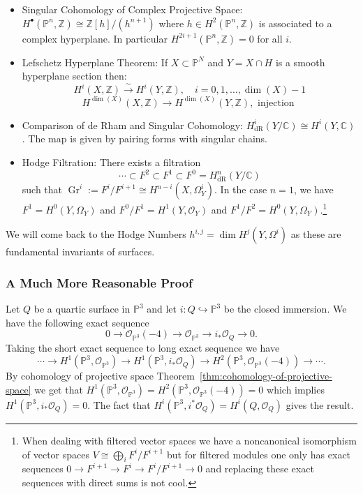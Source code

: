 \documentclass[12pt]{article}
\numberwithin{equation}{section}
\theoremstyle{definition}
\theoremstyle{remark}
\newcommand{\CC}{\mathbb{C}}
\newcommand{\ZZ}{\mathbb{Z}}
\newcommand{\Ocal}{\mathcal{O}}
\newcommand{\PP}{\mathbb{P}}
\newcommand{\dR}{\operatorname{dR}}
\newcommand{\Gr}{\operatorname{Gr}}
\begin{document}
\begin{itemize}
	\item Singular Cohomology of Complex Projective Space: $H^{\bullet}(\PP^n,\ZZ) \cong \ZZ[h]/(h^{n+1})$ where $h\in H^2(\PP^n,\ZZ)$ is associated to a complex hyperplane. 
	In particular $H^{2i+1}(\PP^n,\ZZ)=0$ for all $i$. 
	\item Lefschetz Hyperplane Theorem: If $X \subset \PP^N$ and $Y = X \cap H$ is a smooth hyperplane section then:
	$$ H^i(X,\ZZ) \xrightarrow{\sim} H^i(Y,\ZZ), \quad i=0,1,\ldots,\dim(X)-1 $$
	$$ H^{\dim(X)}(X,\ZZ) \to H^{\dim(X)}(Y,\ZZ), \mbox{ injection } $$
	\item Comparison of de Rham and Singular Cohomology: $H^i_{\dR}(Y/\CC) \cong H^i(Y,\CC)$. 
	The map is given by pairing forms with singular chains. 
	\item Hodge Filtration: There exists a filtration 
	$$\cdots \subset F^2 \subset F^1 \subset F^0 =H^n_{\dR}(Y/\CC)$$ 
	such that $\Gr^{i}:=F^i/F^{i+1} \cong H^{n-i}(X,\Omega_Y^i)$.
	In the case $n=1$, we have $F^1 = H^0(Y,\Omega_Y)$ and $F^0/F^1 = H^1(Y,\Ocal_Y)$ and $F^1/F^2=H^0(Y,\Omega_Y)$.\footnote{
	When dealing with filtered vector spaces we have a noncanonical isomorphism of vector spaces $V \cong \bigoplus_i F^i/F^{i+1}$ but for filtered modules one only has exact sequences $0\to F^{i+1} \to F^i \to F^i/F^{i+1} \to 0$ and replacing these exact sequences with direct sums is not cool. }
\end{itemize}

We will come back to the Hodge Numbers $h^{i,j} = \dim H^j(Y,\Omega^i)$ as these are fundamental invariants of surfaces. 

\subsubsection{A Much More Reasonable Proof}
Let $Q$ be a quartic surface in $\PP^3$ and let $i:Q\hookrightarrow \PP^3$ be the closed immersion. 
We have the following exact sequence 
 $$ 0 \to \Ocal_{\PP^3}(-4) \to \Ocal_{\PP^3} \to i_*\Ocal_Q \to 0. $$
Taking the short exact sequence to long exact sequence we have 
 $$ \cdots \to H^1(\PP^3,\Ocal_{\PP^3}) \to H^1(\PP^3,i_*\Ocal_Q) \to H^2(\PP^3,\Ocal_{\PP^3}(-4) ) \to \cdots.$$
By cohomology of projective space Theorem~\ref{thm:cohomology-of-projective-space} we get that $H^1(\PP^3,\Ocal_{\PP^3})=H^2(\PP^3,\Ocal_{\PP^3}(-4) )=0$ which implies $H^1(\PP^3,i_*\Ocal_Q)=0$. 
The fact that $H^i(\PP^3,i^*\Ocal_Q) = H^i(Q,\Ocal_Q)$ gives the result.
\end{document}
